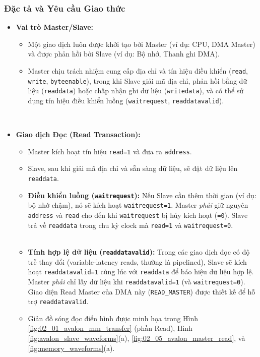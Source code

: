\subsubsection{Đặc tả và Yêu cầu Giao thức}
\begin{itemize}
    \item \textbf{Vai trò Master/Slave:}
    \begin{itemize}
        \item Một giao dịch luôn được khởi tạo bởi Master (ví dụ: CPU, DMA Master) và được phản hồi bởi Slave (ví dụ: Bộ nhớ, Thanh ghi DMA).
        \item Master chịu trách nhiệm cung cấp địa chỉ và tín hiệu điều khiển (\texttt{read}, \texttt{write}, \texttt{byteenable}), trong khi Slave giải mã địa chỉ, phản hồi bằng dữ liệu (\texttt{readdata}) hoặc chấp nhận ghi dữ liệu (\texttt{writedata}), và có thể sử dụng tín hiệu điều khiển luồng (\texttt{waitrequest}, \texttt{readdatavalid}).
    \end{itemize}
    \item \textbf{Giao dịch Đọc (Read Transaction):}
        \begin{itemize}
            \item Master kích hoạt tín hiệu \texttt{read=1} và đưa ra \texttt{address}.
            \item Slave, sau khi giải mã địa chỉ và sẵn sàng dữ liệu, sẽ đặt dữ liệu lên \texttt{readdata}.
            \item \textbf{Điều khiển luồng (\texttt{waitrequest}):} Nếu Slave cần thêm thời gian (ví dụ: bộ nhớ chậm), nó sẽ kích hoạt \texttt{waitrequest=1}. Master \textit{phải} giữ nguyên \texttt{address} và \texttt{read} cho đến khi \texttt{waitrequest} bị hủy kích hoạt (\texttt{=0}). Slave trả về \texttt{readdata} trong chu kỳ clock mà \texttt{read=1} và \texttt{waitrequest=0}.
            \item \textbf{Tính hợp lệ dữ liệu (\texttt{readdatavalid}):} Trong các giao dịch đọc có độ trễ thay đổi (variable-latency reads, thường là pipelined), Slave sẽ kích hoạt \texttt{readdatavalid=1} cùng lúc với \texttt{readdata} để báo hiệu dữ liệu hợp lệ. Master \textit{phải} chỉ lấy dữ liệu khi \texttt{readdatavalid=1} (và \texttt{waitrequest=0}). Giao diện Read Master của DMA này (\texttt{READ\_MASTER}) được thiết kế để hỗ trợ \texttt{readdatavalid}.
            \item Giản đồ sóng đọc điển hình được minh họa trong Hình \ref{fig:02_01_avalon_mm_transfer} (phần Read), Hình \ref{fig:avalon_slave_waveforms}(a), \ref{fig:02_05_avalon_master_read}, và \ref{fig:memory_waveforms}(a).

\end{itemize}
\end{itemize}
